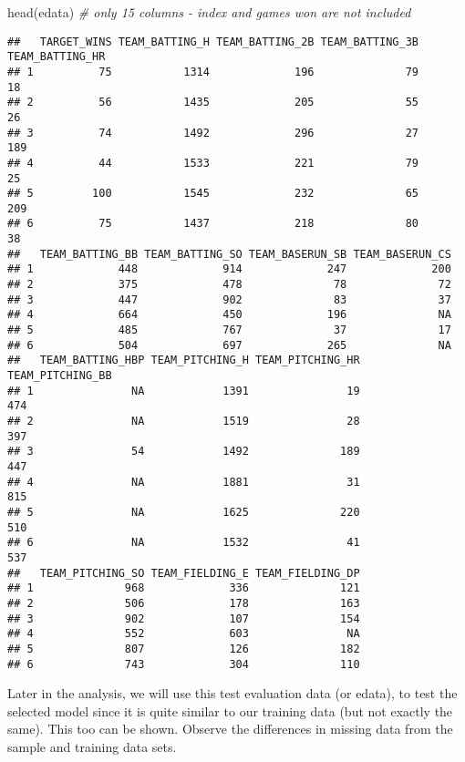 \documentclass[
]{article}
\newenvironment{Shaded}{\begin{snugshade}}{\end{snugshade}}
\newcommand{\CommentTok}[1]{\textcolor[rgb]{0.56,0.35,0.01}{\textit{#1}}}
\newcommand{\FunctionTok}[1]{\textcolor[rgb]{0.00,0.00,0.00}{#1}}
\newcommand{\NormalTok}[1]{#1}
\begin{document}
\begin{Shaded}
\begin{Highlighting}[]
\FunctionTok{head}\NormalTok{(edata) }\CommentTok{\# only 15 columns {-} index and games won are not included}
\end{Highlighting}
\end{Shaded}

\begin{verbatim}
##   TARGET_WINS TEAM_BATTING_H TEAM_BATTING_2B TEAM_BATTING_3B TEAM_BATTING_HR
## 1          75           1314             196              79              18
## 2          56           1435             205              55              26
## 3          74           1492             296              27             189
## 4          44           1533             221              79              25
## 5         100           1545             232              65             209
## 6          75           1437             218              80              38
##   TEAM_BATTING_BB TEAM_BATTING_SO TEAM_BASERUN_SB TEAM_BASERUN_CS
## 1             448             914             247             200
## 2             375             478              78              72
## 3             447             902              83              37
## 4             664             450             196              NA
## 5             485             767              37              17
## 6             504             697             265              NA
##   TEAM_BATTING_HBP TEAM_PITCHING_H TEAM_PITCHING_HR TEAM_PITCHING_BB
## 1               NA            1391               19              474
## 2               NA            1519               28              397
## 3               54            1492              189              447
## 4               NA            1881               31              815
## 5               NA            1625              220              510
## 6               NA            1532               41              537
##   TEAM_PITCHING_SO TEAM_FIELDING_E TEAM_FIELDING_DP
## 1              968             336              121
## 2              506             178              163
## 3              902             107              154
## 4              552             603               NA
## 5              807             126              182
## 6              743             304              110
\end{verbatim}

Later in the analysis, we will use this test evaluation data (or edata),
to test the selected model since it is quite similar to our training
data (but not exactly the same). This too can be shown. Observe the
differences in missing data from the sample and training data sets.
\end{document}
